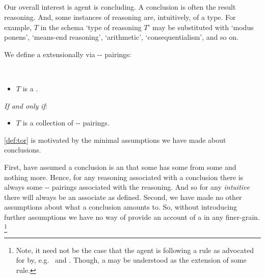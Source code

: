 \subsection{}
\label{cha:typical:tCDef:ToRdef}


\begin{note}
  Our overall interest is agent is concluding.
  A conclusion is often the result reasoning.
  And, some instances of reasoning are, intuitively, of a type.
  For example, \(T\) in the schema `type of reasoning \(T\)' may be substituted with `modus ponens', `means-end reasoning', `arithmetic', `consequentialism', and so on.

  We define a  extensionally via -- pairings:

  \begin{definition}[A \torN{0}]
    \label{def:tor}
    \mbox{ }
    \vspace{-\baselineskip}
    \begin{itemize}
    \item
      \(T\) is a \torN{}.
    \end{itemize}

    \emph{If and only if}:

    \begin{itemize}
    \item
      \(T\) is a collection of -- pairings.
    \end{itemize}
    \vspace{-\baselineskip}
  \end{definition}

  \noindent%
  \autoref{def:tor} is motivated by the minimal assumptions we have made about conclusions.

  First, have assumed a conclusion is an \eval{} that some  has some  from some  and nothing more.
  Hence, for any reasoning associated with a conclusion there is always some -- pairings associated with the reasoning.
  And so for any \emph{intuitive} \torN{} there will always be an associate \torN{} as defined.
  Second, we have made no other assumptions about what a conclusion amounts to.
  So, without introducing further assumptions we have no way of provide an account of a  in any finer-grain.%
  \footnote{
    Note, it need not be the case that the agent is following a rule as advocated for by, e.g.\ \textcite{Boghossian:2008vf,Boghossian:2012vb} and \textcite{Broome:2002aa,Broome:2013aa}.
    Though, a \torNa{} may be understood as the extension of some rule.
  }
\end{note}


